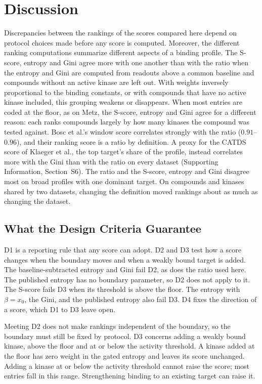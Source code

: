 \section{Discussion}
\label{sec:discussion}


Discrepancies between the rankings of the scores compared here 
depend on protocol choices made before any score is computed. Moreover, the 
different ranking computations summarize different aspects of a binding profile. 
The S-score, entropy and Gini agree more with one another than with
the ratio when the entropy and Gini are computed from readouts above a common
baseline and compounds without an active kinase are left out. With
weights inversely proportional to the binding constants, 
or with compounds that have no active kinase
included, this grouping weakens or disappears. When most entries are
coded at the floor, as on Metz, the S-score, entropy and Gini agree for a
different reason: each ranks compounds largely by how many kinases the
compound was tested against. Bosc et al.'s window score correlates
strongly with the ratio ($0.91$--$0.96$), and their ranking score is a ratio
by definition. A proxy for the CATDS score of Klaeger et al., the top target's
share of the profile, instead correlates more with the Gini than with the
ratio on every dataset (Supporting Information, Section~S6). 
The ratio and the S-score, entropy and
Gini disagree most on broad profiles with one dominant target. 
On compounds and kinases shared by two datasets, changing the
definition moved rankings about as much as changing the dataset.

\subsection{What the Design Criteria Guarantee}

D1 is a reporting rule that any score can adopt. D2 and D3 test how a score
changes when the boundary moves and when a weakly bound target is added.
The baseline-subtracted entropy
and Gini fail D2, as does the ratio used here. The published entropy has no
boundary parameter, so D2 does not apply to it. The S-score fails D3 when its
threshold is above the floor. The entropy with $\beta = x_0$, the Gini, and
the published entropy also fail D3. D4 fixes the direction of a score, which D1
to D3 leave open. 

Meeting D2 does not make rankings independent of the boundary, so the
boundary must still be fixed by protocol. D3 concerns adding a weakly bound
kinase, above the floor and at or below the activity threshold. A kinase
added at the floor has zero weight in the gated entropy and leaves its score
unchanged. Adding a kinase at or below the activity threshold cannot raise
the score; most entries fall in this range. Strengthening binding to an
existing target can raise it.


